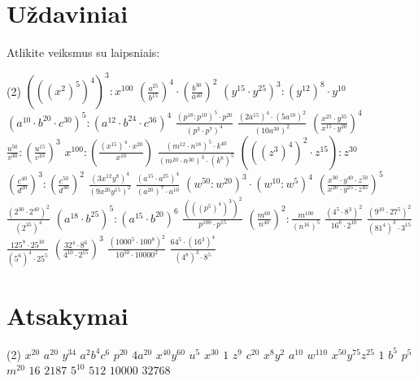 \documentclass[11pt,a4paper]{scrartcl}
\begin{document}
\section{Uždaviniai}
\begin{problem}
Atlikite veiksmus su laipsniais:

\begin{tasks}[label={(\arabic*)},label-offset=0.9em](2)
    \task $(((x^2)^5)^4)^3 : x^{100}$
    \task $\left(\frac{a^{25}}{b^{15}}\right)^4 \cdot \left(\frac{b^{30}}{a^{40}}\right)^2$
    \task $(y^{15} \cdot y^{25})^3 : (y^{12})^8 \cdot y^{10}$
    \task $(a^{10} \cdot b^{20} \cdot c^{30})^5 : (a^{12} \cdot b^{24} \cdot c^{36})^4$
    \task $\frac{(p^{18} : p^{10})^5 \cdot p^{20}}{(p^3 \cdot p^7)^4}$
    \task $\frac{(2a^{15})^4 \cdot (5a^{10})^2}{(10a^{30})^2}$
    \task $\left( \frac{x^{25} \cdot y^{35}}{x^{15} \cdot y^{20}} \right)^4$
    \task $\frac{u^{50}}{v^{30}} : \left(\frac{u^{15}}{v^{10}}\right)^3$
    \task $x^{100} : \left( \frac{(x^{15})^4 \cdot x^{20}}{x^{10}} \right)$
    \task $\frac{(m^{12} \cdot n^{18})^5 \cdot k^{40}}{(m^{20} \cdot n^{30})^3 \cdot (k^8)^5}$
    \task $(((z^3)^4)^2 \cdot z^{15}) : z^{30}$
    \task $\left(\frac{c^{40}}{d^{20}}\right)^3 : \left(\frac{c^{50}}{d^{30}}\right)^2$
    \task $\frac{(3x^{12}y^8)^4}{(9x^{20}y^{15})^2}$
    \task $\frac{(a^{15} \cdot a^{25})^4}{(a^{20})^7 \cdot a^{10}}$
    \task $(w^{50} : w^{20})^3 \cdot (w^{10} : w^5)^4$
    \task $\left( \frac{x^{30} \cdot y^{40} \cdot z^{50}}{x^{20} \cdot y^{25} \cdot z^{45}} \right)^5$
    \task $\frac{(2^{30} \cdot 2^{40})^2}{(2^{35})^4}$
    \task $(a^{18} \cdot b^{25})^5 : (a^{15} \cdot b^{20})^6$
    \task $\frac{(((p^5)^4)^3)^2}{p^{100} \cdot p^{15}}$
    \task $\left(\frac{m^{60}}{n^{40}}\right)^2 : \frac{m^{100}}{(n^{16})^5}$
    \task $\frac{(4^5 \cdot 8^3)^2}{16^6 \cdot 2^{10}}$
    \task $\frac{(9^{10} \cdot 27^5)^2}{(81^4)^3 \cdot 3^{15}}$
    \task $\frac{125^8 \cdot 25^{10}}{(5^6)^4 \cdot 25^5}$
    \task $\left( \frac{32^4 \cdot 8^6}{4^{10} \cdot 2^{15}} \right)^3$
    \task $\frac{(1000^5 \cdot 100^8)^2}{10^{50} \cdot 10000^2}$
    \task $\frac{64^5 \cdot (16^3)^4}{(4^8)^3 \cdot 8^5}$
\end{tasks}
\end{problem}

\newpage
\section{Atsakymai}
\begin{tasks}[label={(\arabic*)}, label-offset=0.9em](2)
    \task $x^{20}$
    \task $a^{20}$
    \task $y^{34}$
    \task $a^2 b^4 c^6$
    \task $p^{20}$
    \task $4a^{20}$
    \task $x^{40} y^{60}$
    \task $u^5$
    \task $x^{30}$
    \task $1$
    \task $z^9$
    \task $c^{20}$
    \task $x^8 y^2$
    \task $a^{10}$
    \task $w^{110}$
    \task $x^{50} y^{75} z^{25}$
    \task $1$
    \task $b^5$
    \task $p^5$
    \task $m^{20}$
    \task $16$
    \task $2187$
    \task $5^{10}$
    \task $512$
    \task $10000$
    \task $32768$
\end{tasks}
\end{document}
